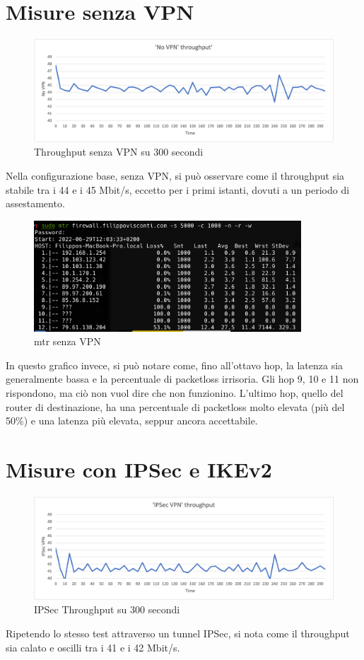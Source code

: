 \section{Misure senza VPN}
\begin{figure}[ht]
    \centering
    \includegraphics[width=12cm]{figure/vpn_thr.png-1.png}
    \caption{Throughput senza VPN su 300 secondi}
\end{figure}
Nella configurazione base, senza VPN, si può osservare come il throughput sia stabile tra i 44 e i 45 Mbit/s, eccetto per i primi istanti, dovuti a un periodo di assestamento.

\begin{figure}[ht]
    \centering
    \includegraphics[width=10cm]{figure/mrt_16min_noVPN.png}
    \caption{mtr senza VPN}
\end{figure}

In questo grafico invece, si può notare come, fino all'ottavo hop, la latenza sia generalmente bassa e la percentuale di packetloss irrisoria. Gli hop 9, 10 e 11 non rispondono, ma ciò non vuol dire che non funzionino. L'ultimo hop, quello del router di destinazione, ha una percentuale di packetloss molto elevata (più del 50\%) e una latenza più elevata, seppur ancora accettabile.

\section{Misure con IPSec e IKEv2}
\begin{figure}[ht]
    \centering
    \includegraphics[width=12cm]{figure/vpn_thr.png-2.png}
    \caption{IPSec Throughput su 300 secondi}
\end{figure}
Ripetendo lo stesso test attraverso un tunnel IPSec, si nota come il throughput sia calato e oscilli tra i 41 e i 42 Mbit/s.

